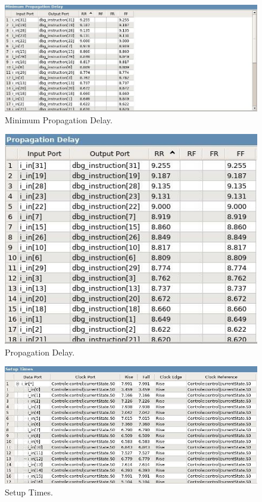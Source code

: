 \documentclass{article}
\begin{document}
        \begin{figure}[H]
            \centering
            \includegraphics[width=\textwidth]{minimum_propagation_delay.jpg}
            \caption{Minimum Propagation Delay.}
            \label{figura:mips}
        \end{figure}

        \begin{figure}[H]
            \centering
            \includegraphics[width=\textwidth]{propagation_delay.jpg}
            \caption{Propagation Delay.}
            \label{figura:mips}
        \end{figure}

        \begin{figure}[H]
            \centering
            \includegraphics[width=\textwidth]{setup_times.jpg}
            \caption{Setup Times.}
            \label{figura:mips}
        \end{figure}
\end{document}
